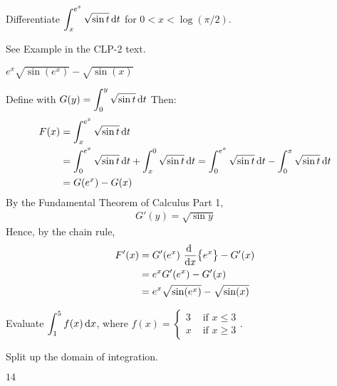 \begin{question}[2014D]
Differentiate
$\displaystyle \int_x^{e^x} \sqrt{\sin t}\,\mathrm{d}t$ for $0<x<\log(\pi/2)$.
\end{question}

\begin{hint}
See Example  in the
CLP-2 text.
\end{hint}

\begin{answer}
$e^x\sqrt{\sin(e^x)} -\sqrt{\sin(x)}$
\end{answer}

\begin{solution}
Define
with
$G(y) = \displaystyle\int_0^y \sqrt{\sin t}\,\mathrm{d}t$
Then:
\begin{align*}
F(x)&=\int_x^{e^x} \sqrt{\sin t}\,\mathrm{d}t \\
&= \int_0^{e^x} \sqrt{\sin t}\,\mathrm{d}t + \int_x^0 \sqrt{\sin t}\,\mathrm{d}t
= \int_0^{e^x} \sqrt{\sin t}\,\mathrm{d}t - \int_0^x \sqrt{\sin t}\,\mathrm{d}t \\
&=G(e^x) - G(x)
\end{align*}
By the Fundamental Theorem of Calculus Part 1,
\begin{align*}
G'(y)=\sqrt{\sin y}\qquad
\end{align*}
Hence, by the chain rule,
\begin{align*}
F'(x) &= G'(e^x)\ \diff{}{x}\big\{e^x\big\} - G'(x)\\
 &=  e^xG'(e^x) - G'(x)\\
&=e^x\sqrt{\sin(e^x)} -\sqrt{\sin(x)}
\end{align*}
\end{solution}



\begin{question}[M105 2014A]
Evaluate $\displaystyle \int_1^5 f(x)\,\mathrm{d}x$, where
$\displaystyle f(x)= \begin{cases} 3 &\text{ if $x\le 3$} \\
                                   x &\text{ if $x\ge 3$}
                     \end{cases}$.
\end{question}

\begin{hint}
Split up the domain of integration.
\end{hint}

\begin{answer}
$14$
\end{answer}

